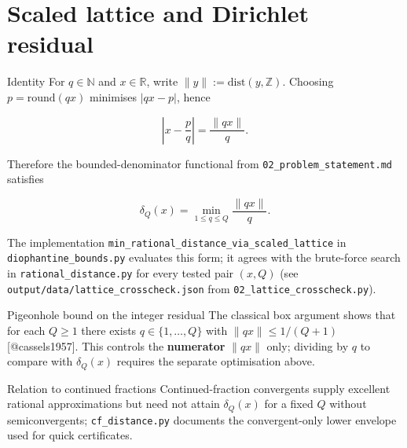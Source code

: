 \documentclass[
  ignorenonframetext,
]{beamer}
\author{\texorpdfstring{}{}}
\date{}
\begin{document}
\section{Scaled lattice and Dirichlet
residual}\label{scaled-lattice-and-dirichlet-residual}

\begin{frame}[fragile]{Identity}
\protect{}\label{identity}
For \(q \in \mathbb{N}\) and \(x \in \mathbb{R}\), write
\(\|y\| := \mathrm{dist}(y,\mathbb{Z})\). Choosing
\(p = \mathrm{round}(qx)\) minimises \(|qx - p|\), hence

\[
\left|x - \frac{p}{q}\right| = \frac{\|qx\|}{q}.
\]

Therefore the bounded-denominator functional from
\texttt{02\_problem\_statement.md} satisfies

\[
\delta_Q(x) = \min_{1 \leq q \leq Q} \frac{\|qx\|}{q}.
\]

The implementation
\texttt{min\_rational\_distance\_via\_scaled\_lattice} in
\texttt{diophantine\_bounds.py} evaluates this form; it agrees with the
brute-force search in \texttt{rational\_distance.py} for every tested
pair \((x,Q)\) (see \texttt{output/data/lattice\_crosscheck.json} from
\texttt{02\_lattice\_crosscheck.py}).
\end{frame}

\begin{frame}{Pigeonhole bound on the integer residual}
\protect{}\label{pigeonhole-bound-on-the-integer-residual}
The classical box argument shows that for each \(Q \geq 1\) there exists
\(q \in \{1,\ldots,Q\}\) with \(\|qx\| \leq 1/(Q+1)\)
{[}@cassels1957{]}. This controls the \textbf{numerator} \(\|qx\|\)
only; dividing by \(q\) to compare with \(\delta_Q(x)\) requires the
separate optimisation above.
\end{frame}

\begin{frame}[fragile]{Relation to continued fractions}
\protect{}\label{relation-to-continued-fractions}
Continued-fraction convergents supply excellent rational approximations
but need not attain \(\delta_Q(x)\) for a fixed \(Q\) without
semiconvergents; \texttt{cf\_distance.py} documents the convergent-only
lower envelope used for quick certificates.
\end{frame}
\end{document}
